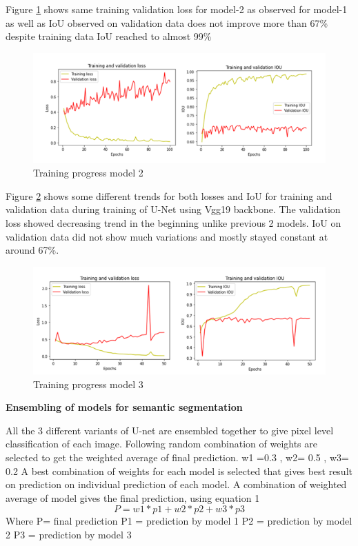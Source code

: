 \documentclass[rnd]{mas_proposal}
\begin{document}
Figure \ref{fig:Training progress model 2} shows same training validation loss for model-2 as observed for model-1 as well as IoU observed on validation data does not improve more 
than 67\% despite training data IoU reached to almost 99\%

\begin{figure}[htp] 
        \centering
        \includegraphics[width=1.2\textwidth]{images/fig10.png}
        \caption{Training progress model 2}%
        \label{fig:Training progress model 2}%
\end{figure}


Figure \ref{fig:Training progress model 3} shows some different trends for both losses and IoU for training and validation data during training of U-Net using Vgg19 backbone.
 The validation loss showed decreasing trend in the beginning unlike previous 2 models. IoU on validation data did not show much variations and mostly 
 stayed constant at around 67\%.  
 \begin{figure}[htp] 
        \centering
        \includegraphics[width=1.2\textwidth]{images/fig11.png}
        \caption{Training progress model 3}%
        \label{fig:Training progress model 3}%
\end{figure}

\textbf{Ensembling of models for semantic segmentation}
\vspace{10px}

All the 3 different variants of U-net are ensembled together to give pixel level classification of each image. 
Following random combination of weights are selected to get the weighted average of final prediction.  
w1 =0.3 ,  w2= 0.5 ,  w3= 0.2
A best combination of weights for each model is selected that gives best result on prediction on individual prediction of each model. 
A combination of weighted average of model gives the final prediction, using equation 1
                    $$P=  w1*p1 + w2*p2 + w3*p3   $$
Where
P= final prediction 
P1 = prediction by model 1 
P2 = prediction by model 2
P3 = prediction by model 3
\end{document}
